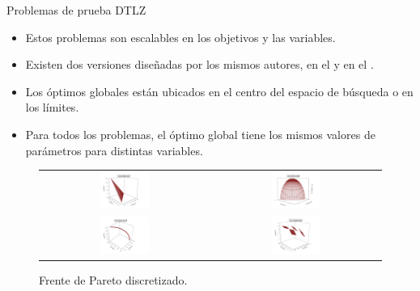 \documentclass{beamer}
\begin{document}
\begin{frame}{Problemas de prueba DTLZ}
\begin{itemize}
   \scriptsize
   \item Estos problemas son escalables en los objetivos y las variables.
   \item Existen dos versiones diseñadas por los mismos autores, en el \citeyear{Joel:DTLZ_1} y en el \citeyear{Joel:DTLZ_2}.
   \item Los óptimos globales están ubicados en el centro del espacio de búsqueda o en los límites.
   \item Para todos los problemas, el óptimo global tiene los mismos valores de parámetros para distintas variables.
\end{itemize}
\begin{figure}[H]
\begin{tabular}{c c}
\includegraphics[width=0.3\textwidth]{DTLZ1.jpg}     &  \includegraphics[width=0.3\textwidth]{DTLZ3.jpg} \\
\includegraphics[width=0.3\textwidth]{DTLZ5.jpg}     &  \includegraphics[width=0.3\textwidth]{DTLZ7.jpg} \\
\end{tabular}
\centering
\caption{\scriptsize Frente de Pareto discretizado.}
\end{figure}

\end{frame}
\end{document}
